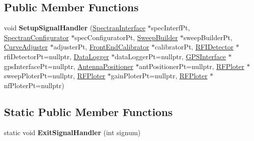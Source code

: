 \subsection*{Public Member Functions}
\begin{DoxyCompactItemize}
\item 
\mbox{\label{classSignalHandler_aac189962a11b36ed582bd837b99e503b}} 
void {\bfseries Setup\+Signal\+Handler} (\hyperlink{classSpectranInterface}{Spectran\+Interface} $\ast$spec\+Interf\+Pt, \hyperlink{classSpectranConfigurator}{Spectran\+Configurator} $\ast$spec\+Configurator\+Pt, \hyperlink{classSweepBuilder}{Sweep\+Builder} $\ast$sweep\+Builder\+Pt, \hyperlink{classCurveAdjuster}{Curve\+Adjuster} $\ast$adjuster\+Pt, \hyperlink{classFrontEndCalibrator}{Front\+End\+Calibrator} $\ast$calibrator\+Pt, \hyperlink{classRFIDetector}{R\+F\+I\+Detector} $\ast$rfi\+Detector\+Pt=nullptr, \hyperlink{classDataLogger}{Data\+Logger} $\ast$data\+Logger\+Pt=nullptr, \hyperlink{classGPSInterface}{G\+P\+S\+Interface} $\ast$gps\+Interface\+Pt=nullptr, \hyperlink{classAntennaPositioner}{Antenna\+Positioner} $\ast$ant\+Positioner\+Pt=nullptr, \hyperlink{classRFPloter}{R\+F\+Ploter} $\ast$sweep\+Ploter\+Pt=nullptr, \hyperlink{classRFPloter}{R\+F\+Ploter} $\ast$gain\+Ploter\+Pt=nullptr, \hyperlink{classRFPloter}{R\+F\+Ploter} $\ast$nf\+Ploter\+Pt=nullptr)
\end{DoxyCompactItemize}
\subsection*{Static Public Member Functions}
\begin{DoxyCompactItemize}
\item 
\mbox{\label{classSignalHandler_af32b7213b43fd13fa12587a0c0d9b565}} 
static void {\bfseries Exit\+Signal\+Handler} (int signum)
\end{DoxyCompactItemize}
